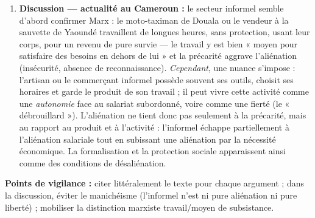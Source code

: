 \documentclass[11pt]{article}
\begin{document}
\begin{corrige}
\begin{enumerate}
    \item \textbf{Discussion — actualité au Cameroun :} le secteur informel semble d'abord confirmer Marx : le moto-taximan de Douala ou le vendeur à la sauvette de Yaoundé travaillent de longues heures, sans protection, usant leur corps, pour un revenu de pure survie — le travail y est bien « moyen pour satisfaire des besoins en dehors de lui » et la précarité aggrave l'aliénation (insécurité, absence de reconnaissance). \emph{Cependant}, une nuance s'impose : l'artisan ou le commerçant informel possède souvent ses outils, choisit ses horaires et garde le produit de son travail ; il peut vivre cette activité comme une \emph{autonomie} face au salariat subordonné, voire comme une fierté (le « débrouillard »). L'aliénation ne tient donc pas seulement à la précarité, mais au rapport au produit et à l'activité : l'informel échappe partiellement à l'aliénation salariale tout en subissant une aliénation par la nécessité économique. La formalisation et la protection sociale apparaissent ainsi comme des conditions de désaliénation.
\end{enumerate}
\textbf{Points de vigilance :} citer littéralement le texte pour chaque argument ; dans la discussion, éviter le manichéisme (l'informel n'est ni pure aliénation ni pure liberté) ; mobiliser la distinction marxiste travail/moyen de subsistance.
\end{corrige}
\end{document}
